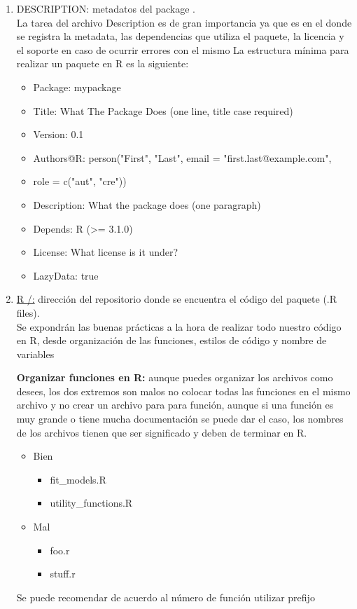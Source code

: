 \begin{enumerate}
  \item  DESCRIPTION: metadatos del package .\\
La tarea del archivo Description es de gran importancia ya que es en el donde se registra la metadata, las dependencias que utiliza el paquete, la licencia y el soporte en caso de ocurrir errores con el mismo
La estructura mínima para realizar un paquete en R es la siguiente:

\begin{itemize}
\item Package: mypackage
\item Title: What The Package Does (one line, title case required)
\item Version: 0.1
\item Authors@R: person("First", "Last", email = "first.last@example.com",
\item role = c("aut", "cre"))
\item Description: What the package does (one paragraph)
\item Depends: R (>= 3.1.0)
\item License: What license is it under?
\item LazyData: true
\end{itemize}
  \item \url{R /:} dirección del repositorio donde se encuentra el código del paquete (.R files).\\
Se expondrán las buenas prácticas a la hora de realizar todo nuestro código en R, desde organización de las funciones, estilos de código y nombre de variables 

\textbf{Organizar funciones en R:} aunque puedes organizar los archivos como desees, los dos extremos son malos no colocar todas las funciones en el mismo archivo y no crear un archivo para para función, aunque si una función es muy grande o tiene mucha documentación se puede dar el caso, los nombres de los archivos tienen que ser significado y deben de terminar en R.
\begin{itemize}
\item Bien  
\begin{itemize}
     \item fit\_models.R
     \item utility\_functions.R
  \end{itemize}
\item Mal
   \begin{itemize}
      \item foo.r
      \item stuff.r
    \end{itemize}
 \end{itemize}
Se puede recomendar de acuerdo al número de función utilizar prefijo 


\end{enumerate}
